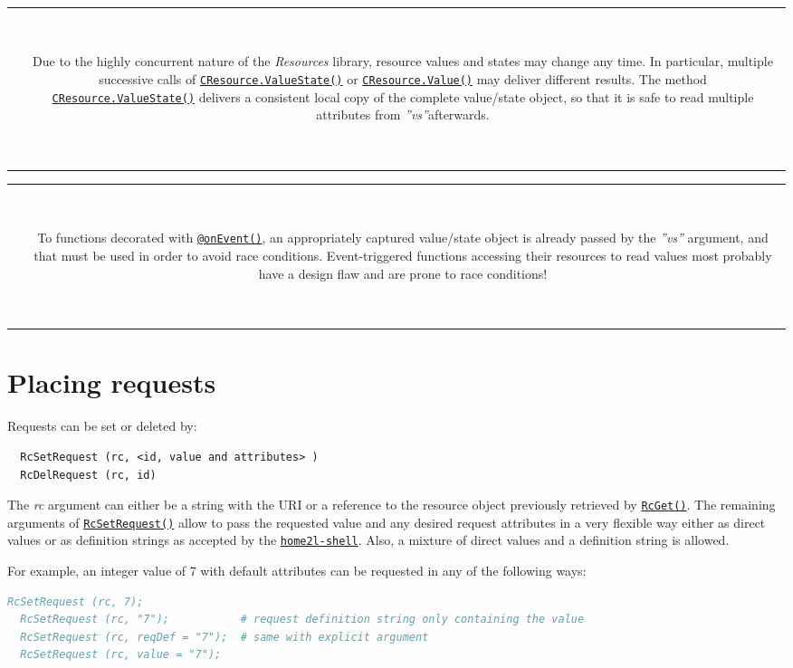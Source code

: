 \documentclass[12pt,english,parskip=half,headheight=19pt]{scrreprt}
\newcommand{\warnbox}[1]{
  \par
  \medskip
  \hfill
  \setlength\arrayrulewidth{1pt}
  \begin{tabular}[b]{c|c|}
    
    &
    \,\parbox{0.89\linewidth}{\setlength{\parskip}{0.5em}#1}\,
  \end{tabular}
  \medskip
  \par
}
\newcommand{\idx}[1]{#1\index{#1}}
\newcommand{\reftool}[1]{\hyperref[tool:#1]{\texttt{\idx{#1}}}}
\newcommand{\refapipython}[1]{\href{home2l-api_python/index.html}{\mbox{\texttt{#1}}}}  %
\begin{document}
\warnbox{
  Due to the highly concurrent nature of the \textit{Resources} library, resource values and
  states may change any time. In particular, multiple successive calls of \refapipython{CResource.ValueState()} or
  \refapipython{CResource.Value()} may deliver different results.
  The method \refapipython{CResource.ValueState()} delivers a consistent local copy of
  the complete value/state object, so that it is safe to read multiple attributes
  from \textit{''vs''}afterwards.
}


\warnbox{
  To functions decorated with \refapipython{@onEvent()}, an appropriately captured value/state
  object is already passed by the \textit{''vs''} argument, and that must be used in order
  to avoid race conditions. Event-triggered functions accessing their resources to read values
  most probably have a design flaw and are prone to race conditions!
}





\section{Placing requests}
\label{sec:rules-requests}

Requests can be set or deleted by:
\begin{lstlisting}
  RcSetRequest (rc, <id, value and attributes> )
  RcDelRequest (rc, id)
\end{lstlisting}

The \textit{rc} argument can either be a string with the URI or a reference to the resource object previously retrieved by \refapipython{RcGet()}. The remaining arguments of \refapipython{RcSetRequest()} allow to pass the requested value and any desired request attributes in a very flexible way either as direct values or as definition strings as accepted by the \reftool{home2l-shell}. Also, a mixture of direct values and a definition string is allowed.

For example, an integer value of 7 with default attributes can be requested in any of the following ways:
\begin{lstlisting}[language=comments]
  RcSetRequest (rc, 7);
  RcSetRequest (rc, "7");           # request definition string only containing the value
  RcSetRequest (rc, reqDef = "7");  # same with explicit argument
  RcSetRequest (rc, value = "7");
\end{lstlisting}
\end{document}
